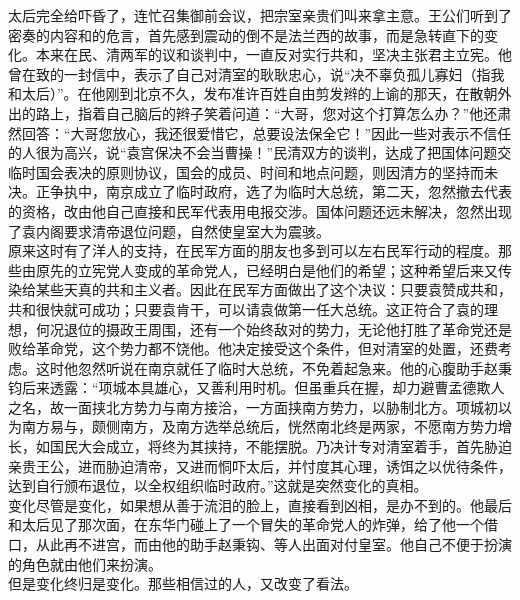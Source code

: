 太后完全给吓昏了，连忙召集御前会议，把宗室亲贵们叫来拿主意。王公们听到了密奏的内容和的危言，首先感到震动的倒不是法兰西的故事，而是急转直下的变化。本来在民、清两军的议和谈判中，一直反对实行共和，坚决主张君主立宪。他曾在致的一封信中，表示了自己对清室的耿耿忠心，说“决不辜负孤儿寡妇（指我和太后）”。在他刚到北京不久，发布准许百姓自由剪发辫的上谕的那天，在散朝外出的路上，指着自己脑后的辫子笑着问道：“大哥，您对这个打算怎么办？”他还肃然回答：“大哥您放心，我还很爱惜它，总要设法保全它！”因此一些对表示不信任的人很为高兴，说“袁宫保决不会当曹操！”民清双方的谈判，达成了把国体问题交临时国会表决的原则协议，国会的成员、时间和地点问题，则因清方的坚持而未决。正争执中，南京成立了临时政府，选了为临时大总统，第二天，忽然撤去代表的资格，改由他自己直接和民军代表用电报交涉。国体问题还远未解决，忽然出现了袁内阁要求清帝退位问题，自然使皇室大为震骇。\\

原来这时有了洋人的支持，在民军方面的朋友也多到可以左右民军行动的程度。那些由原先的立宪党人变成的革命党人，已经明白是他们的希望；这种希望后来又传染给某些天真的共和主义者。因此在民军方面做出了这个决议：只要袁赞成共和，共和很快就可成功；只要袁肯干，可以请袁做第一任大总统。这正符合了袁的理想，何况退位的摄政王周围，还有一个始终敌对的势力，无论他打胜了革命党还是败给革命党，这个势力都不饶他。他决定接受这个条件，但对清室的处置，还费考虑。这时他忽然听说在南京就任了临时大总统，不免着起急来。他的心腹助手赵秉钧后来透露：“项城本具雄心，又善利用时机。但虽重兵在握，却力避曹孟德欺人之名，故一面挟北方势力与南方接洽，一方面挟南方势力，以胁制北方。项城初以为南方易与，颇侧南方，及南方选举总统后，恍然南北终是两家，不愿南方势力增长，如国民大会成立，将终为其挟持，不能摆脱。乃决计专对清室着手，首先胁迫亲贵王公，进而胁迫清帝，又进而恫吓太后，并忖度其心理，诱饵之以优待条件，达到自行颁布退位，以全权组织临时政府。”这就是突然变化的真相。\\

变化尽管是变化，如果想从善于流泪的脸上，直接看到凶相，是办不到的。他最后和太后见了那次面，在东华门碰上了一个冒失的革命党人的炸弹，给了他一个借口，从此再不进宫，而由他的助手赵秉钩、等人出面对付皇室。他自己不便于扮演的角色就由他们来扮演。\\

但是变化终归是变化。那些相信过的人，又改变了看法。\\

